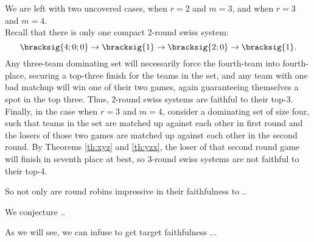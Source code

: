 {{        We are left with two uncovered cases, when $r = 2$ and $m = 3$, and when $r = 3$ and $m = 4.$\\

        Recall that there is only one compact 2-round swiss system: $$\bracksig{4;0;0} \to \bracksig{1} \to \bracksig{2;0} \to \bracksig{1}.$$ Any three-team dominating set will necessarily force the fourth-team into fourth-place, securing a top-three finish for the teams in the set, and any team with one bad matchup will win one of their two games, again guaranteeing themselves a spot in the top three. Thus, $2$-round swiss systems are faithful to their top-3.\\

        Finally, in the case when $r = 3$ and $m = 4$, consider a dominating set of size four, such that teams in the set are matched up against each other in first round and the losers of those two games are matched up against each other in the second round. By Theorems \ref{th:xyz} and \ref{th:yzx}, the loser of that second round game will finish in seventh place at best, so $3$-round swiss systems are not faithful to their top-4.
    }{}

    So not only are round robins impressive in their faithfulness to ..

    We conjecture ..

    As we will see, we can infuse to get target faithfulness ...






}